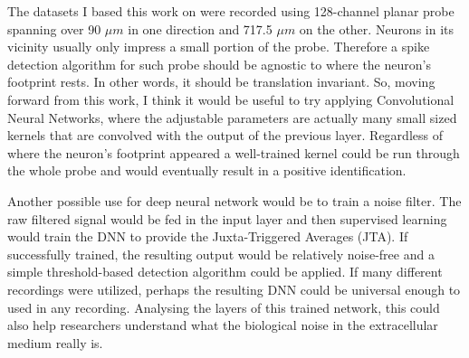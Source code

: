 The datasets I based this work on were recorded using 128-channel planar probe spanning over 90 $\mu m$ in one direction and 717.5 $\mu m$ on the other. Neurons in its vicinity usually only impress a small portion of the probe. Therefore a spike detection algorithm for such probe should be agnostic to where the neuron's footprint rests. In other words, it should be translation invariant. So, moving forward from this work, I think it would be useful to try applying Convolutional Neural Networks, where the adjustable parameters are actually many small sized kernels that are convolved with the output of the previous layer. Regardless of where the neuron's footprint appeared a well-trained kernel could be run through the whole probe and would eventually result in a positive identification.

Another possible use for deep neural network would be to train a noise filter. The raw filtered signal would be fed in the input layer and then supervised learning would train the DNN to provide the Juxta-Triggered Averages (JTA). If successfully trained, the resulting output would be relatively noise-free and a simple threshold-based detection algorithm could be applied. If many different recordings were utilized, perhaps the resulting DNN could be universal enough to used in any recording.
Analysing the layers of this trained network, this could also help researchers understand what the biological noise in the extracellular medium really is.

\cleardoublepage

